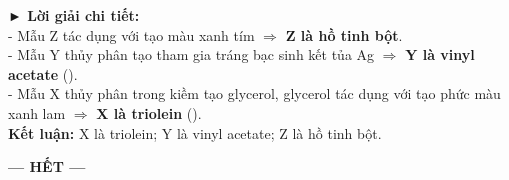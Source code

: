 \documentclass[11pt,a4paper]{article}
\begin{document}
\begin{tcolorbox}[colback=white,colframe=solBlue,arc=1mm,boxrule=0.5pt,top=2mm,bottom=2mm,left=3mm,right=3mm]
{\color{solBlue}\textbf{► Lời giải chi tiết:}}\\
- Mẫu Z tác dụng với  tạo màu xanh tím $\Rightarrow$ \textbf{Z là hồ tinh bột}.\\
- Mẫu Y thủy phân tạo  tham gia tráng bạc sinh kết tủa Ag $\Rightarrow$ \textbf{Y là vinyl acetate} ().\\
- Mẫu X thủy phân trong kiềm tạo glycerol, glycerol tác dụng với  tạo phức màu xanh lam $\Rightarrow$ \textbf{X là triolein} ().\\
\textbf{Kết luận:} X là triolein; Y là vinyl acetate; Z là hồ tinh bột.
\end{tcolorbox}

\begin{center}
\textbf{--- HẾT ---}
\end{center}
\end{document}
